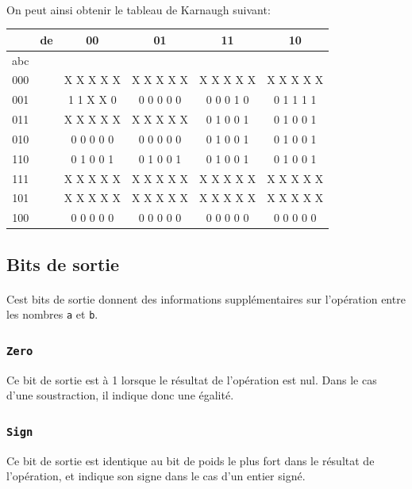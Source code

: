 \documentclass[11pt, a4paper, twoside, titlepage]{article}
\begin{document}
\paragraph{}
On peut ainsi obtenir le tableau de Karnaugh suivant:
\begin{center}
	\ttfamily
	\large
	\begin{tabular}{|c|c|c|c|c|c|}
		\hline
		& de & 00 & 01 & 11 & 10 \\
		\hline
		abc &&&&& \\
		\hline 
		000 && X X X X X & X X X X X & X X X X X & X X X X X \\
		\hline 
		001 && 1 1 X X 0 & 0 0 0 0 0 & 0 0 0 1 0 & 0 1 1 1 1 \\
		\hline 
		011 && X X X X X & X X X X X & 0 1 0 0 1 & 0 1 0 0 1 \\
		\hline 
		010 && 0 0 0 0 0 & 0 0 0 0 0 & 0 1 0 0 1 & 0 1 0 0 1\\
		\hline 
		110 && 0 1 0 0 1 & 0 1 0 0 1 & 0 1 0 0 1 & 0 1 0 0 1 \\
		\hline 
		111 && X X X X X & X X X X X & X X X X X & X X X X X \\
		\hline 
		101 && X X X X X & X X X X X & X X X X X & X X X X X \\
		\hline 
		100 && 0 0 0 0 0 & 0 0 0 0 0 & 0 0 0 0 0 & 0 0 0 0 0 \\
		\hline
	\end{tabular}
\end{center}

\subsection{Bits de sortie}
\paragraph{}
Cest bits de sortie donnent des informations supplémentaires sur l'opération entre les nombres \texttt{a} et \texttt{b}.
	
\subsubsection{\texttt{Zero}}
Ce bit de sortie est à 1 lorsque le résultat de l'opération est nul. Dans le cas d'une soustraction, il indique donc une égalité.

\subsubsection{\texttt{Sign}}
Ce bit de sortie est identique au bit de poids le plus fort dans le résultat de l'opération, et indique son signe dans le cas d'un entier signé.
\end{document}
